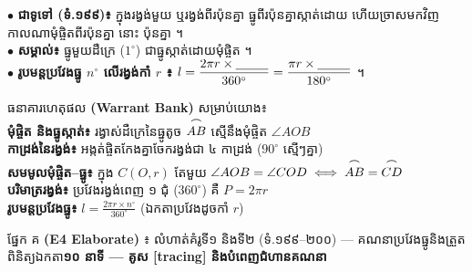 \documentclass[a4paper,10pt]{article}
\newcommand{\en}[1]{{\TimesEn #1}}
\newcommand{\enbf}[1]{{\TimesEn\bfseries #1}}
\newcommand{\cnum}[1]{\mbox{\fontsize{10pt}{12pt}\selectfont\ding{\numexpr181+#1\relax}}}
\newcommand{\ang}[1]{\ensuremath{\angle #1}}
\newcommand{\arc}[1]{\ensuremath{\overset{\tikz[baseline=-0.55ex]\draw[black, line width=0.55pt] (0,0) to[bend left=40] (1.8ex,0);}{#1}}}
\newcommand{\blank}[1]{\underline{\hspace{#1}}}
\newcommand{\secbox}[2]{%
  \begin{tcolorbox}[
    enhanced, sharp corners, colback=headgray, colframe=black,
    boxrule=0.95pt, boxsep=1pt, top=2.0pt, bottom=2.0pt, left=6pt, right=6pt,
    before skip=3pt, after skip=2pt
  ]
    {\muol\fontsize{9.2pt}{13.2pt}\selectfont #1}\hfill{\fontsize{8.2pt}{11.5pt}\selectfont\textbf{#2}}
  \end{tcolorbox}%
}
\begin{document}
\noindent
\begin{minipage}[t]{9.6cm}
  \fontsize{8.9pt}{12.7pt}\selectfont
  $\bullet$ \textbf{ជាទូទៅ (ទំ.១៩៩)៖} ក្នុងរង្វង់មួយ ឬរង្វង់ពីរប៉ុនគ្នា ធ្នូពីរប៉ុនគ្នាស្កាត់ដោយ \blank{2.5cm} ហើយច្រាសមកវិញ កាលណាមុំផ្ចិតពីរប៉ុនគ្នា នោះ \blank{2.5cm} ប៉ុនគ្នា ។\\[2pt]
  $\bullet$ \textbf{សម្គាល់៖} ធ្នូមួយដឺក្រេ ($1^\circ$) ជាធ្នូស្កាត់ដោយមុំផ្ចិត \blank{1.2cm} ។\\[2pt]
  $\bullet$ \textbf{រូបមន្តប្រវែងធ្នូ $n^\circ$ លើរង្វង់កាំ $r$ ៖} $l = \dfrac{2\pi r \times \blank{0.9cm}}{360^\circ} = \dfrac{\pi r \times \blank{0.9cm}}{180^\circ}$ ។
\end{minipage}%
\hfill
\begin{minipage}[t]{9.0cm}
  \begin{tcolorbox}[enhanced, sharp corners, colback=panelgray, colframe=black, boxrule=0.85pt, boxsep=1pt, top=2.5pt, bottom=2.5pt, left=5pt, right=5pt]
    {\muol\fontsize{8.7pt}{12.0pt}\selectfont ធនាគារហេតុផល \enbf{(Warrant Bank)} សម្រាប់យោង៖}\\[1.5pt]
    \fontsize{8.3pt}{11.5pt}\selectfont
    \cnum{1} \textbf{មុំផ្ចិត និងធ្នូស្កាត់៖} រង្វាស់ដឺក្រេនៃធ្នូតូច $\arc{AB}$ ស្មើនឹងមុំផ្ចិត $\ang{AOB}$\\
    \cnum{2} \textbf{កាដ្រង់នៃរង្វង់៖} អង្កត់ផ្ចិតកែងគ្នាចែករង្វង់ជា ៤ កាដ្រង់ ($90^\circ$ ស្មើៗគ្នា)\\
    \cnum{3} \textbf{សមមូលមុំផ្ចិត--ធ្នូ៖} ក្នុង $C(O,r)$ តែមួយ $\ang{AOB}=\ang{COD} \iff \arc{AB}=\arc{CD}$\\
    \cnum{4} \textbf{បរិមាត្ររង្វង់៖} ប្រវែងរង្វង់ពេញ ១ ជុំ ($360^\circ$) គឺ $P = 2\pi r$\\
    \cnum{5} \textbf{រូបមន្តប្រវែងធ្នូ៖} $l = \frac{2\pi r \times n^\circ}{360^\circ}$ (ឯកតាប្រវែងដូចកាំ $r$)
  \end{tcolorbox}
\end{minipage}

\newpage

\secbox{ផ្នែក គ \enbf{(E4 Elaborate)} ៖ លំហាត់គំរូទី១ និងទី២ (ទំ.១៩៩--២០០) — គណនាប្រវែងធ្នូនិងត្រួតពិនិត្យឯកតា}{១០ នាទី \en{---} គូស [tracing] និងបំពេញជំហានគណនា}
\end{document}
